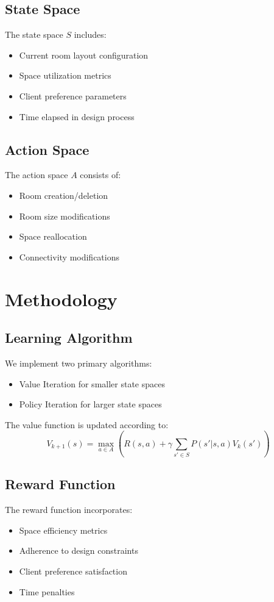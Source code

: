 \documentclass[12pt]{article}
\begin{document}
\subsection{State Space}
The state space $S$ includes:
\begin{itemize}
    \item Current room layout configuration
    \item Space utilization metrics
    \item Client preference parameters
    \item Time elapsed in design process
\end{itemize}

\subsection{Action Space}
The action space $A$ consists of:
\begin{itemize}
    \item Room creation/deletion
    \item Room size modifications
    \item Space reallocation
    \item Connectivity modifications
\end{itemize}

\section{Methodology}
\subsection{Learning Algorithm}
We implement two primary algorithms:
\begin{itemize}
    \item Value Iteration for smaller state spaces
    \item Policy Iteration for larger state spaces
\end{itemize}

The value function is updated according to:
\begin{equation}
    V_{k+1}(s) = \max_{a \in A} \left(R(s,a) + \gamma \sum_{s' \in S} P(s'|s,a)V_k(s')\right)
\end{equation}

\subsection{Reward Function}
The reward function incorporates:
\begin{itemize}
    \item Space efficiency metrics
    \item Adherence to design constraints
    \item Client preference satisfaction
    \item Time penalties
\end{itemize}
\end{document}
